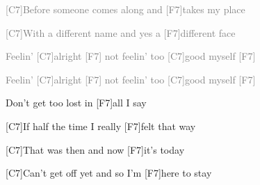 \documentclass[12pt]{article}
\begin{document}
\vspace{0.00mm}
\setlength{\parindent}{0.00mm}
\setlength{\leftskip}{-5.94mm}
\setlength{\rightskip}{0.00mm}
\raggedright
\textcolor{gray}{{[C7]Before someone comes along and [F7]takes my place}}
\vspace{0.00mm}

\vspace{0.00mm}
\setlength{\parindent}{0.00mm}
\setlength{\leftskip}{-5.94mm}
\setlength{\rightskip}{0.00mm}
\raggedright
\textcolor{gray}{{[C7]With a different name and yes a [F7]different face}}\textcolor{gray}{{}}
\vspace{0.00mm}

\vspace{0.00mm}
\setlength{\parindent}{0.00mm}
\setlength{\leftskip}{-5.94mm}
\setlength{\rightskip}{0.00mm}
\raggedright
\textcolor{gray}{{}}
\vspace{0.00mm}

\vspace{0.00mm}
\setlength{\parindent}{0.00mm}
\setlength{\leftskip}{-5.94mm}
\setlength{\rightskip}{0.00mm}
\raggedright
\textcolor{gray}{{Feelin' [C7]alright   [F7]  not feelin' too [C7]good myself  [F7]  }}
\vspace{0.00mm}

\vspace{0.00mm}
\setlength{\parindent}{0.00mm}
\setlength{\leftskip}{-5.94mm}
\setlength{\rightskip}{0.00mm}
\raggedright
\textcolor{gray}{{Feelin' [C7]alright   [F7]  not feelin' too [C7]good myself  [F7]  }}
\vspace{0.00mm}

\vspace{0.00mm}
\setlength{\parindent}{0.00mm}
\setlength{\leftskip}{-6.25mm}
\setlength{\rightskip}{0.00mm}
\raggedright
Don't get too lost in [F7]all I say
\vspace{0.00mm}

\vspace{0.00mm}
\setlength{\parindent}{0.00mm}
\setlength{\leftskip}{-6.25mm}
\setlength{\rightskip}{0.00mm}
\raggedright
[C7]If half the time I really [F7]felt that way
\vspace{0.00mm}

\vspace{0.00mm}
\setlength{\parindent}{0.00mm}
\setlength{\leftskip}{-6.25mm}
\setlength{\rightskip}{0.00mm}
\raggedright
[C7]That was then and now [F7]it's today
\vspace{0.00mm}

\vspace{0.00mm}
\setlength{\parindent}{0.00mm}
\setlength{\leftskip}{-6.25mm}
\setlength{\rightskip}{0.00mm}
\raggedright
[C7]Can't get off yet and so I'm [F7]here to stay
\vspace{0.00mm}
\end{document}
